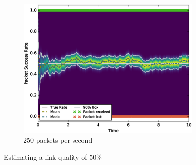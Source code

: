\documentclass[10pt,a4paper]{article}
\begin{document}
\begin{figure}[h!]
\begin{subfigure}[b]{\textwidth}
		\includegraphics[width=\textwidth]{trust/const-0-5-rate-250}
		\caption{$250$ packets per second}
	\end{subfigure}
  \caption{Estimating a link quality of $50\%$}
\end{figure}
\end{document}
